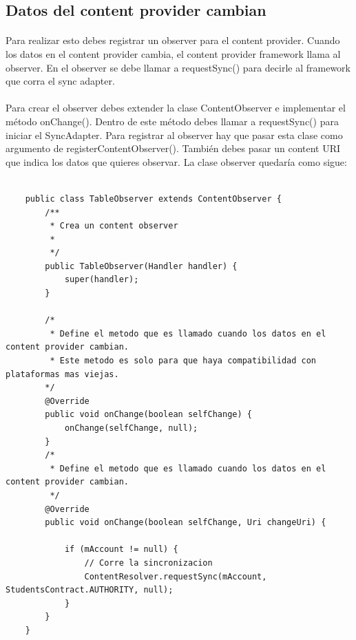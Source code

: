 \documentclass[10pt]{extarticle}
\begin{document}
\subsection{Datos del content provider cambian}

\paragraph{}
Para realizar esto debes registrar un observer para el content provider. Cuando los datos en el content provider cambia, el content provider framework llama al observer. En el observer se debe llamar a requestSync() para decirle al framework que corra el sync adapter.

\paragraph{}
Para crear el observer debes extender la clase ContentObserver e implementar el método onChange(). Dentro de este método debes llamar a requestSync() para iniciar el SyncAdapter. Para registrar al observer hay que pasar esta clase como argumento de registerContentObserver(). También debes pasar un content URI que indica los datos que quieres observar. La clase observer quedaría como sigue:

\begin{lstlisting}

    public class TableObserver extends ContentObserver {
        /**
         * Crea un content observer
         *
         */
        public TableObserver(Handler handler) {
            super(handler);
        }

        /*
         * Define el metodo que es llamado cuando los datos en el content provider cambian.
         * Este metodo es solo para que haya compatibilidad con plataformas mas viejas.
        */
        @Override
        public void onChange(boolean selfChange) {
            onChange(selfChange, null);
        }
        /*
         * Define el metodo que es llamado cuando los datos en el content provider cambian.
         */
        @Override
        public void onChange(boolean selfChange, Uri changeUri) {
            
            if (mAccount != null) {
                // Corre la sincronizacion
                ContentResolver.requestSync(mAccount, StudentsContract.AUTHORITY, null);
            }
        }
    }

\end{lstlisting} 
\end{document}
